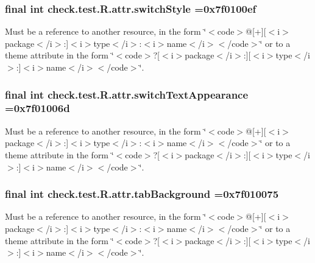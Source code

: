 \subsubsection[{switch\+Style}]{\setlength{\rightskip}{0pt plus 5cm}final int check.\+test.\+R.\+attr.\+switch\+Style =0x7f0100ef\hspace{0.3cm}{\ttfamily [static]}}\label{classcheck_1_1test_1_1_r_1_1attr_a9ae7872d556d50683fe08cd498d71991}
Must be a reference to another resource, in the form \char`\"{}$<$code$>$@\mbox{[}+\mbox{]}\mbox{[}$<$i$>$package$<$/i$>$\+:\mbox{]}$<$i$>$type$<$/i$>$\+:$<$i$>$name$<$/i$>$$<$/code$>$\char`\"{} or to a theme attribute in the form \char`\"{}$<$code$>$?\mbox{[}$<$i$>$package$<$/i$>$\+:\mbox{]}\mbox{[}$<$i$>$type$<$/i$>$\+:\mbox{]}$<$i$>$name$<$/i$>$$<$/code$>$\char`\"{}. \hypertarget{classcheck_1_1test_1_1_r_1_1attr_a208fa18b2eaf663f264d200f28ca74c2}{}
\subsubsection[{switch\+Text\+Appearance}]{\setlength{\rightskip}{0pt plus 5cm}final int check.\+test.\+R.\+attr.\+switch\+Text\+Appearance =0x7f01006d\hspace{0.3cm}{\ttfamily [static]}}\label{classcheck_1_1test_1_1_r_1_1attr_a208fa18b2eaf663f264d200f28ca74c2}
Must be a reference to another resource, in the form \char`\"{}$<$code$>$@\mbox{[}+\mbox{]}\mbox{[}$<$i$>$package$<$/i$>$\+:\mbox{]}$<$i$>$type$<$/i$>$\+:$<$i$>$name$<$/i$>$$<$/code$>$\char`\"{} or to a theme attribute in the form \char`\"{}$<$code$>$?\mbox{[}$<$i$>$package$<$/i$>$\+:\mbox{]}\mbox{[}$<$i$>$type$<$/i$>$\+:\mbox{]}$<$i$>$name$<$/i$>$$<$/code$>$\char`\"{}. \hypertarget{classcheck_1_1test_1_1_r_1_1attr_a90d48386b6c277d4bb8f496ca85d7fa4}{}
\subsubsection[{tab\+Background}]{\setlength{\rightskip}{0pt plus 5cm}final int check.\+test.\+R.\+attr.\+tab\+Background =0x7f010075\hspace{0.3cm}{\ttfamily [static]}}\label{classcheck_1_1test_1_1_r_1_1attr_a90d48386b6c277d4bb8f496ca85d7fa4}
Must be a reference to another resource, in the form \char`\"{}$<$code$>$@\mbox{[}+\mbox{]}\mbox{[}$<$i$>$package$<$/i$>$\+:\mbox{]}$<$i$>$type$<$/i$>$\+:$<$i$>$name$<$/i$>$$<$/code$>$\char`\"{} or to a theme attribute in the form \char`\"{}$<$code$>$?\mbox{[}$<$i$>$package$<$/i$>$\+:\mbox{]}\mbox{[}$<$i$>$type$<$/i$>$\+:\mbox{]}$<$i$>$name$<$/i$>$$<$/code$>$\char`\"{}. \hypertarget{classcheck_1_1test_1_1_r_1_1attr_af4fc4df4ea303d1145e27e9279ff4f2e}{}
